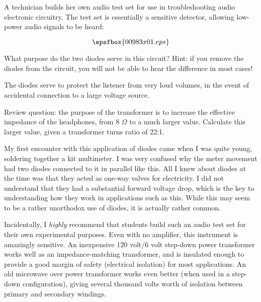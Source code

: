 

A technician builds her own audio test set for use in troubleshooting audio electronic circuitry.  The test set is essentially a sensitive detector, allowing low-power audio signals to be heard:

$$\epsfbox{00983x01.eps}$$

What purpose do the two diodes serve in this circuit?  Hint: if you remove the diodes from the circuit, you will not be able to hear the difference in most cases!







The diodes serve to protect the listener from very loud volumes, in the event of accidental connection to a large voltage source.

\vskip 10pt

Review question: the purpose of the transformer is to increase the effective impedance of the headphones, from 8 $\Omega$ to a much larger value.  Calculate this larger value, given a transformer turns ratio of 22:1.







My first encounter with this application of diodes came when I was quite young, soldering together a kit multimeter.  I was very confused why the meter movement had two diodes connected to it in parallel like this.  All I knew about diodes at the time was that they acted as one-way valves for electricity.  I did not understand that they had a substantial forward voltage drop, which is the key to understanding how they work in applications such as this.  While this may seem to be a rather unorthodox use of diodes, it is actually rather common.

Incidentally, I {\it highly} recommend that students build such an audio test set for their own experimental purposes.  Even with no amplifier, this instrument is amazingly sensitive.  An inexpensive 120 volt/6 volt step-down power transformer works well as an impedance-matching transformer, and is insulated enough to provide a good margin of safety (electrical isolation) for most applications.  An old microwave over power transformer works even better (when used in a step-down configuration), giving several thousand volts worth of isolation between primary and secondary windings.  

